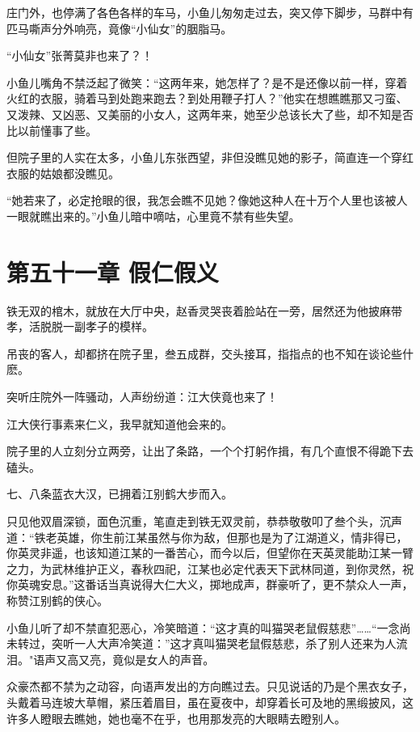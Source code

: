 \documentclass[12pt,oneside]{book}
\begin{document}
庄门外，也停满了各色各样的车马，小鱼儿匆匆走过去，突又停下脚步，马群中有匹马嘶声分外响亮，竟像``小仙女''的胭脂马。

``小仙女''张菁莫非也来了？！

小鱼儿嘴角不禁泛起了微笑：``这两年来，她怎样了？是不是还像以前一样，穿着火红的衣服，骑着马到处跑来跑去？到处用鞭子打人？''他实在想瞧瞧那又刁蛮、又泼辣、又凶恶、又美丽的小女人，这两年来，她至少总该长大了些，却不知是否比以前懂事了些。

但院子里的人实在太多，小鱼儿东张西望，非但没瞧见她的影子，简直连一个穿红衣服的姑娘都没瞧见。

``她若来了，必定抢眼的很，我怎会瞧不见她？像她这种人在十万个人里也该被人一眼就瞧出来的。''小鱼儿暗中嘀咕，心里竟不禁有些失望。

\hypertarget{ux7b2cux4e94ux5341ux4e00ux7ae0-ux5047ux4ec1ux5047ux4e49}{%
\chapter{第五十一章
假仁假义}\label{ux7b2cux4e94ux5341ux4e00ux7ae0-ux5047ux4ec1ux5047ux4e49}}

铁无双的棺木，就放在大厅中央，赵香灵哭丧着脸站在一旁，居然还为他披麻带孝，活脱脱一副孝子的模样。

吊丧的客人，却都挤在院子里，叁五成群，交头接耳，指指点的也不知在谈论些什麽。

突听庄院外一阵骚动，人声纷纷道：江大侠竟也来了！

江大侠行事素来仁义，我早就知道他会来的。

院子里的人立刻分立两旁，让出了条路，一个个打躬作揖，有几个直恨不得跪下去磕头。

七、八条蓝衣大汉，已拥着江别鹤大步而入。

只见他双眉深锁，面色沉重，笔直走到铁无双灵前，恭恭敬敬叩了叁个头，沉声道：``铁老英雄，你生前江某虽然与你为敌，但那也是为了江湖道义，情非得已，你英灵非遥，也该知道江某的一番苦心，而今以后，但望你在天英灵能助江某一臂之力，为武林维护正义，春秋四祀，江某也必定代表天下武林同道，到你灵然，祝你英魂安息。''这番话当真说得大仁大义，掷地成声，群豪听了，更不禁众人一声，称赞江别鹤的侠心。

小鱼儿听了却不禁直犯恶心，冷笑暗道：``这才真的叫猫哭老鼠假慈悲''\ldots\ldots{}``一念尚未转过，突听一人大声冷笑道：''这才真叫猫哭老鼠假慈悲，杀了别人还来为人流泪。"语声又高又亮，竟似是女人的声音。

众豪杰都不禁为之动容，向语声发出的方向瞧过去。只见说话的乃是个黑衣女子，头戴着马连坡大草帽，紧压着眉目，虽在夏夜中，却穿着长可及地的黑缎披风，这许多人瞪眼去瞧她，她也毫不在乎，也用那发亮的大眼睛去瞪别人。
\end{document}
